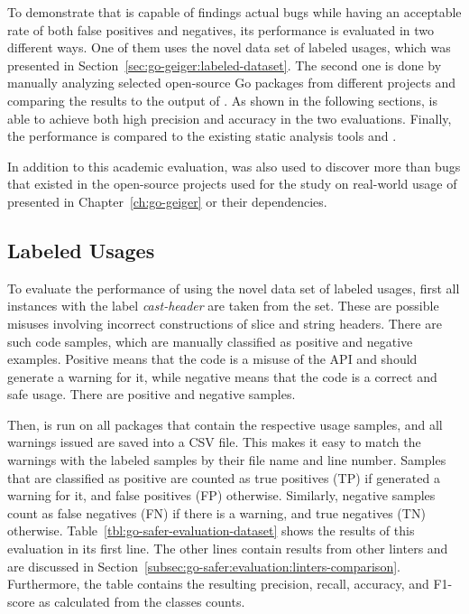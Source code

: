To demonstrate that \toolSafer{} is capable of findings actual bugs while having an acceptable rate of both false
positives and negatives, its performance is evaluated in two different ways.
One of them uses the novel data set of labeled \unsafe{} usages, which was presented in
Section~\ref{sec:go-geiger:labeled-dataset}.
The second one is done by manually analyzing  selected open-source Go packages from different projects and
comparing the results to the output of \toolSafer{}.
As shown in the following sections, \toolSafer{} is able to achieve both high precision and accuracy in the two
evaluations.
Finally, the performance is compared to the existing static analysis tools \toolVet{} and \toolGosec{}.

In addition to this academic evaluation, \toolSafer{} was also used to discover more than \numberBugsFixedRounded{} bugs
that existed in the open-source projects used for the study on real-world usage of \unsafe{} presented in
Chapter~\ref{ch:go-geiger} or their dependencies.



\subsection{Labeled Usages}\label{subsec:go-safer:evaluation:labeled-usages}

To evaluate the performance of \toolSafer{} using the novel data set of labeled \unsafe{} usages, first all instances
with the label \textit{cast-header} are taken from the set.
These are possible misuses involving incorrect constructions of slice and string headers.
There are  such code samples, which are manually classified as positive and negative examples.
Positive means that the code is a misuse of the \unsafe{} \acrshort{API} and \toolSafer{} should generate a warning for
it, while negative means that the code is a correct and safe usage.
There are  positive and  negative samples.

Then, \toolSafer{} is run on all packages that contain the respective  \unsafe{} usage samples, and all
warnings issued are saved into a \acrshort{CSV} file.
This makes it easy to match the warnings with the labeled samples by their file name and line number.
Samples that are classified as positive are counted as true positives (TP) if \toolSafer{} generated a warning for it,
and false positives (FP) otherwise.
Similarly, negative samples count as false negatives (FN) if there is a warning, and true negatives (TN) otherwise.
Table~\ref{tbl:go-safer-evaluation-dataset} shows the results of this evaluation in its first line.
The other lines contain results from other linters and are discussed in
Section~\ref{subsec:go-safer:evaluation:linters-comparison}.
Furthermore, the table contains the resulting precision, recall, accuracy, and F1-score as calculated from the classes
counts.

